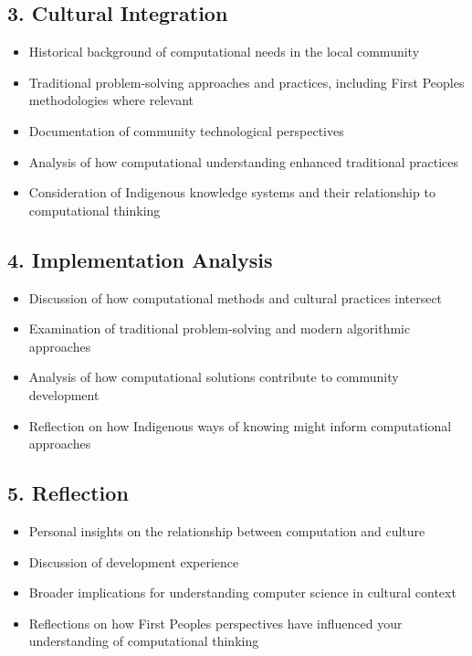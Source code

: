 \documentclass[12pt]{article}
\begin{document}
\subsection*{3. Cultural Integration }
\begin{itemize}
    \item Historical background of computational needs in the local community
    \item Traditional problem-solving approaches and practices, including First Peoples methodologies where relevant
    \item Documentation of community technological perspectives
    \item Analysis of how computational understanding enhanced traditional practices
    \item Consideration of Indigenous knowledge systems and their relationship to computational thinking
\end{itemize}

\subsection*{4. Implementation Analysis }
\begin{itemize}
    \item Discussion of how computational methods and cultural practices intersect
    \item Examination of traditional problem-solving and modern algorithmic approaches
    \item Analysis of how computational solutions contribute to community development
    \item Reflection on how Indigenous ways of knowing might inform computational approaches
\end{itemize}

\subsection*{5. Reflection }
\begin{itemize}
    \item Personal insights on the relationship between computation and culture
    \item Discussion of development experience
    \item Broader implications for understanding computer science in cultural context
    \item Reflections on how First Peoples perspectives have influenced your understanding of computational thinking
\end{itemize}
\end{document}
